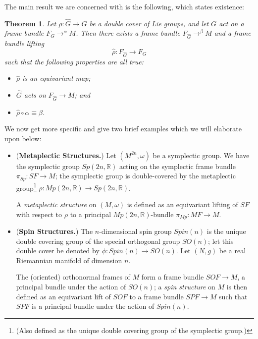 \documentclass{tufte-handout}
\newtheorem{thrm}{Theorem} %
\begin{document}
The main result we are concerned with is the following, which states existence:
\begin{fullwidth}
\begin{thrm} %
Let $\rho: \hat{G} \to G$ be a double cover of Lie groups, and let $G$ act on a frame bundle $F_G \to^{\alpha} M$. Then there exists a frame bundle $F_{\hat{G}} \to^{\beta} M$ and a frame bundle lifting
$$
\hat{\rho} : F_{\hat{G}} \to F_G
$$
such that the following properties are all true:
\begin{itemize}
\item $\hat{\rho}$ is an equivariant map;
\item $\hat{G}$ acts on $F_{\hat{G}} \to M$; and
\item $\hat{\rho} \circ \alpha \equiv \beta$.
\end{itemize}
\end{thrm}
\end{fullwidth}

We now get more specific and give two brief examples which we will elaborate upon below:
\begin{itemize}
\item (\textbf{Metaplectic Structures.}) Let $(M^{2n},\omega)$ be a symplectic group. We have the symplectic group $Sp(2n,\mathbb{R})$ acting on the symplectic frame bundle $\pi_{Sp}: SF \to M$; the symplectic group is double-covered by the metaplectic group\footnote{(Also defined as the unique double covering group of the symplectic group.)} $\rho: Mp(2n,\mathbb{R}) \to Sp(2n,\mathbb{R})$.

A \emph{metaplectic structure} on $(M,\omega)$ is defined as an equivariant lifting of $SF$ with respect to $\rho$ to a principal $Mp(2n,\mathbb{R})$-bundle $\pi_{Mp}: MF \to M$.

\item (\textbf{Spin Structures.}) The $n$-dimensional spin group $Spin(n)$ is the unique double covering group of the special orthogonal group $SO(n)$; let this double cover be denoted by $\phi: Spin(n) \to SO(n)$. Let $(N,g)$ be a real Riemannian manifold of dimension $n$.

The (oriented) orthonormal frames of $M$ form a frame bundle $SOF \to M$, a principal bundle under the action of $SO(n)$; a \emph{spin structure} on $M$ is then defined as an equivariant lift of $SOF$ to a frame bundle $SPF \to M$ such that $SPF$ is a principal bundle under the action of $Spin(n)$.
\end{itemize}
\end{document}

